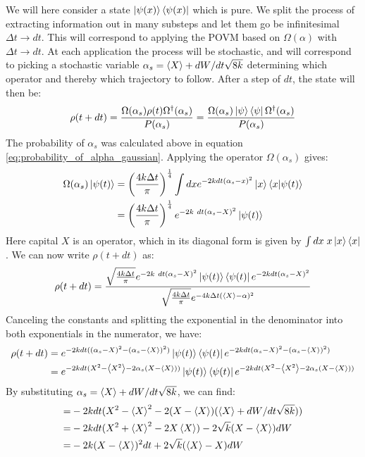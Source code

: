 We will here consider a state $\ket{\psi(x)}\bra{\psi(x)}$ which is pure. We split the process of extracting information out in many substeps and let them go be infinitesimal $\Delta t \to dt$. This will correspond to applying the POVM based on ${\Omega(\alpha)}$ with $\Delta t \to dt$. At each application the process will be stochastic, and will correspond to picking a stochastic variable $\alpha_s =\expval{X} + {dW}/{dt \sqrt{8k}}$ determining which operator and thereby which trajectory to follow. After a step of $dt$, the state will then be:
\begin{equation}
    \rho(t+dt) = \frac{\Omega(\alpha_s) \rho(t)  \Omega^\dagger(\alpha_s)}{P(\alpha_s)} = \frac{\Omega(\alpha_s) \ket{\psi}\bra{\psi}  \Omega^\dagger(\alpha_s)}{P(\alpha_s)} 
\end{equation}
The probability of $\alpha_s$ was calculated above in equation \ref{eq:probability_of_alpha_gaussian}. Applying the operator $\Omega(\alpha_s)$ gives:
\begin{align*}
    \Omega(\alpha_s)\ket{\psi(t)} &=  \left(\frac{4 k \Delta t}{\pi}\right)^\frac14\int dx e^{-2k dt (\alpha_s - x)^2} \ket{x}\bra{x} \ket{\psi(t)} \\
                                  &=  \left(\frac{4 k \Delta t}{\pi}\right)^\frac14 e^{-2k\ dt (\alpha_s - X)^2} \ket{\psi(t)}
\end{align*}
Here capital $X$ is an operator, which in its diagonal form is given by $\int dx \;x \ket{x}\bra{x}$. We can now write $\rho(t+dt)$ as:
\begin{equation}
    \rho(t + dt) =\frac{\sqrt{\frac{4 k \Delta t}{\pi}}e^{-2k\ dt (\alpha_s - X)^2} \ket{\psi(t)}\bra{\psi(t)}e^{-2k dt (\alpha_s - X)^2}}{\sqrt{\frac{4 k \Delta t}{\pi}}  e^{-4k\Delta t (\expval{X} - \alpha)^2}}    
\end{equation}
Canceling the constants and splitting the exponential in the denominator into both exponentials in the numerator, we have:
\begin{align*}
    \rho(t + dt) &= e^{-2k dt ((\alpha_s - X)^2 - (\alpha_s - \expval{X})^2)} \ket{\psi(t)}\bra{\psi(t)}e^{-2k dt (\alpha_s - X)^2 - (\alpha_s - \expval{X})^2)} \\
            &= e^{-2kdt (X^2 - \expval{X^2} - 2 \alpha_s(X - \expval{X}))}\ket{\psi(t)}\bra{\psi(t)}  e^{-2kdt (X^2 - \expval{X^2} - 2 \alpha_s(X - \expval{X}))}
\end{align*}
By substituting $\alpha_s = \expval{X} + {dW}/{dt \sqrt{8k}}$, we can find:
\begin{align*}
     = &-2kdt (X^2 - \expval{X}^2 - 2(X - \expval{X})(\expval{X} + {dW}/{dt \sqrt{8k}})) \\
     = &-2kdt(X^2 + \expval{X}^2 - 2 X \expval{X}) - 2\sqrt{k}(X -\expval{X})dW \\
     = &-2k(X - \expval{X})^2dt + 2\sqrt{k}(\expval{X} - X)dW
\end{align*}

